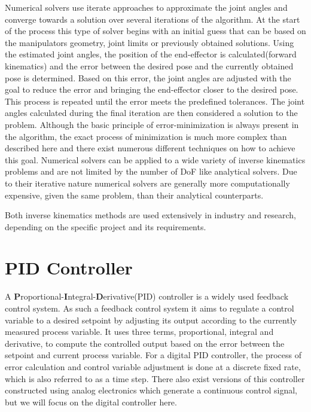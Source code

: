 Numerical solvers use iterate approaches to approximate the joint angles and converge towards a solution over several iterations of the algorithm.
At the start of the process this type of solver begins with an initial guess that can be based on the manipulators geometry, joint limits or previously obtained solutions.
Using the estimated joint angles, the position of the end-effector is calculated(forward kinematics) and the error between the desired pose and the currently obtained pose is determined.
Based on this error, the joint angles are adjusted with the goal to reduce the error and bringing the end-effector closer to the desired pose.
This process is repeated until the error meets the predefined tolerances.
The joint angles calculated during the final iteration are then considered a solution to the problem.
Although the basic principle of error-minimization is always present in the algorithm, the exact process of minimization is much more complex than described here and there exist numerous different techniques on how to achieve this goal.
Numerical solvers can be applied to a wide variety of inverse kinematics problems and are not limited by the number of DoF like analytical solvers.
Due to their iterative nature numerical solvers are generally more computationally expensive, given the same problem, than their analytical counterparts.

Both inverse kinematics methods are used extensively in industry and research, depending on the specific project and its requirements.




\section{PID Controller}
A \textbf{P}roportional-\textbf{I}ntegral-\textbf{D}erivative(PID) controller is a widely used feedback control system.
As such a feedback control system it aims to regulate a control variable to a desired setpoint by adjusting its output according to the currently measured process variable.
It uses three terms, proportional, integral and derivative, to compute the controlled output  based on the error between the setpoint and current process variable.
For a digital PID controller, the process of error calculation and control variable adjustment is done at a discrete fixed rate, which is also referred to as a time step.
There also exist versions of this controller constructed using analog electronics which generate a continuous control signal, but we will focus on the digital controller here.

